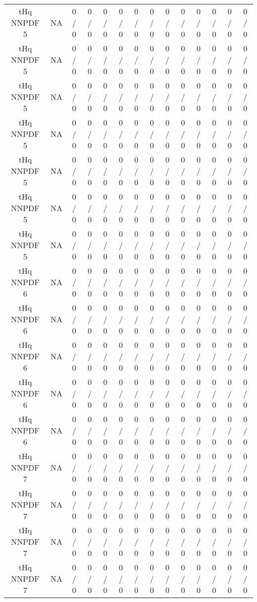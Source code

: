 \documentclass[10pt]{article}
\begin{document}
\begin{table}[htbp]
\begin{center}
\begin{tabular}{|c|c|c|c|c|c|c|c|c|c|c|c|c|c|}
  tHq NNPDF 5 &    NA    & 0 / 0 & 0 / 0 & 0 / 0 & 0 / 0 & 0 / 0 & 0 / 0 & 0 / 0 & 0 / 0 & 0 / 0 & 0 / 0 & 0 / 0 & 0 / 0 \\ 
  tHq NNPDF 5 &    NA    & 0 / 0 & 0 / 0 & 0 / 0 & 0 / 0 & 0 / 0 & 0 / 0 & 0 / 0 & 0 / 0 & 0 / 0 & 0 / 0 & 0 / 0 & 0 / 0 \\ 
  tHq NNPDF 5 &    NA    & 0 / 0 & 0 / 0 & 0 / 0 & 0 / 0 & 0 / 0 & 0 / 0 & 0 / 0 & 0 / 0 & 0 / 0 & 0 / 0 & 0 / 0 & 0 / 0 \\ 
  tHq NNPDF 5 &    NA    & 0 / 0 & 0 / 0 & 0 / 0 & 0 / 0 & 0 / 0 & 0 / 0 & 0 / 0 & 0 / 0 & 0 / 0 & 0 / 0 & 0 / 0 & 0 / 0 \\ 
  tHq NNPDF 5 &    NA    & 0 / 0 & 0 / 0 & 0 / 0 & 0 / 0 & 0 / 0 & 0 / 0 & 0 / 0 & 0 / 0 & 0 / 0 & 0 / 0 & 0 / 0 & 0 / 0 \\ 
  tHq NNPDF 5 &    NA    & 0 / 0 & 0 / 0 & 0 / 0 & 0 / 0 & 0 / 0 & 0 / 0 & 0 / 0 & 0 / 0 & 0 / 0 & 0 / 0 & 0 / 0 & 0 / 0 \\ 
  tHq NNPDF 5 &    NA    & 0 / 0 & 0 / 0 & 0 / 0 & 0 / 0 & 0 / 0 & 0 / 0 & 0 / 0 & 0 / 0 & 0 / 0 & 0 / 0 & 0 / 0 & 0 / 0 \\ 
  tHq NNPDF 6 &    NA    & 0 / 0 & 0 / 0 & 0 / 0 & 0 / 0 & 0 / 0 & 0 / 0 & 0 / 0 & 0 / 0 & 0 / 0 & 0 / 0 & 0 / 0 & 0 / 0 \\ 
  tHq NNPDF 6 &    NA    & 0 / 0 & 0 / 0 & 0 / 0 & 0 / 0 & 0 / 0 & 0 / 0 & 0 / 0 & 0 / 0 & 0 / 0 & 0 / 0 & 0 / 0 & 0 / 0 \\ 
  tHq NNPDF 6 &    NA    & 0 / 0 & 0 / 0 & 0 / 0 & 0 / 0 & 0 / 0 & 0 / 0 & 0 / 0 & 0 / 0 & 0 / 0 & 0 / 0 & 0 / 0 & 0 / 0 \\ 
  tHq NNPDF 6 &    NA    & 0 / 0 & 0 / 0 & 0 / 0 & 0 / 0 & 0 / 0 & 0 / 0 & 0 / 0 & 0 / 0 & 0 / 0 & 0 / 0 & 0 / 0 & 0 / 0 \\ 
  tHq NNPDF 6 &    NA    & 0 / 0 & 0 / 0 & 0 / 0 & 0 / 0 & 0 / 0 & 0 / 0 & 0 / 0 & 0 / 0 & 0 / 0 & 0 / 0 & 0 / 0 & 0 / 0 \\ 
  tHq NNPDF 7 &    NA    & 0 / 0 & 0 / 0 & 0 / 0 & 0 / 0 & 0 / 0 & 0 / 0 & 0 / 0 & 0 / 0 & 0 / 0 & 0 / 0 & 0 / 0 & 0 / 0 \\ 
  tHq NNPDF 7 &    NA    & 0 / 0 & 0 / 0 & 0 / 0 & 0 / 0 & 0 / 0 & 0 / 0 & 0 / 0 & 0 / 0 & 0 / 0 & 0 / 0 & 0 / 0 & 0 / 0 \\ 
  tHq NNPDF 7 &    NA    & 0 / 0 & 0 / 0 & 0 / 0 & 0 / 0 & 0 / 0 & 0 / 0 & 0 / 0 & 0 / 0 & 0 / 0 & 0 / 0 & 0 / 0 & 0 / 0 \\ 
  tHq NNPDF 7 &    NA    & 0 / 0 & 0 / 0 & 0 / 0 & 0 / 0 & 0 / 0 & 0 / 0 & 0 / 0 & 0 / 0 & 0 / 0 & 0 / 0 & 0 / 0 & 0 / 0 \\ 

\end{tabular}
\end{center}
\end{table}
\end{document}
